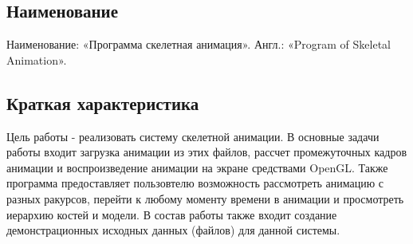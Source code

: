 \subsection{Наименование}
Наименование: «Программа скелетная анимация». Англ.: «Program of Skeletal Animation».


\subsection{Краткая характеристика}
    Цель работы - реализовать систему скелетной анимации. 
    В основные задачи работы входит загрузка анимации из этих файлов, рассчет промежуточных кадров анимации и воспроизведение анимации на экране средствами OpenGL. 
    Также программа предоставляет пользовтелю возможность рассмотреть анимацию с разных ракурсов, перейти к любому моменту времени в анимации и просмотреть иерархию костей и модели.
В состав работы также входит создание демонстрационных исходных данных (файлов) для данной системы.

